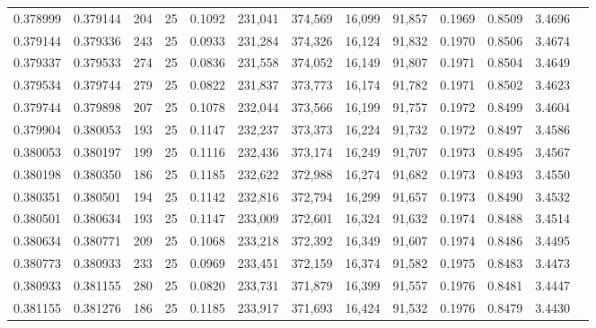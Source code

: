 \begin{tabular}{rrrrrrrrrrrrr}
0.378999 & 0.379144 &   204 &  25 &                                     0.1092 & 231,041 & 374,569 &  16,099 &  91,857 & 0.1969 & 0.8509 & 3.4696 \\
0.379144 & 0.379336 &   243 &  25 &                                     0.0933 & 231,284 & 374,326 &  16,124 &  91,832 & 0.1970 & 0.8506 & 3.4674 \\
0.379337 & 0.379533 &   274 &  25 &                                     0.0836 & 231,558 & 374,052 &  16,149 &  91,807 & 0.1971 & 0.8504 & 3.4649 \\
0.379534 & 0.379744 &   279 &  25 &                                     0.0822 & 231,837 & 373,773 &  16,174 &  91,782 & 0.1971 & 0.8502 & 3.4623 \\
0.379744 & 0.379898 &   207 &  25 &                                     0.1078 & 232,044 & 373,566 &  16,199 &  91,757 & 0.1972 & 0.8499 & 3.4604 \\
0.379904 & 0.380053 &   193 &  25 &                                     0.1147 & 232,237 & 373,373 &  16,224 &  91,732 & 0.1972 & 0.8497 & 3.4586 \\
0.380053 & 0.380197 &   199 &  25 &                                     0.1116 & 232,436 & 373,174 &  16,249 &  91,707 & 0.1973 & 0.8495 & 3.4567 \\
0.380198 & 0.380350 &   186 &  25 &                                     0.1185 & 232,622 & 372,988 &  16,274 &  91,682 & 0.1973 & 0.8493 & 3.4550 \\
0.380351 & 0.380501 &   194 &  25 &                                     0.1142 & 232,816 & 372,794 &  16,299 &  91,657 & 0.1973 & 0.8490 & 3.4532 \\
0.380501 & 0.380634 &   193 &  25 &                                     0.1147 & 233,009 & 372,601 &  16,324 &  91,632 & 0.1974 & 0.8488 & 3.4514 \\
0.380634 & 0.380771 &   209 &  25 &                                     0.1068 & 233,218 & 372,392 &  16,349 &  91,607 & 0.1974 & 0.8486 & 3.4495 \\
0.380773 & 0.380933 &   233 &  25 &                                     0.0969 & 233,451 & 372,159 &  16,374 &  91,582 & 0.1975 & 0.8483 & 3.4473 \\
0.380933 & 0.381155 &   280 &  25 &                                     0.0820 & 233,731 & 371,879 &  16,399 &  91,557 & 0.1976 & 0.8481 & 3.4447 \\
0.381155 & 0.381276 &   186 &  25 &                                     0.1185 & 233,917 & 371,693 &  16,424 &  91,532 & 0.1976 & 0.8479 & 3.4430 \\

\end{tabular}
